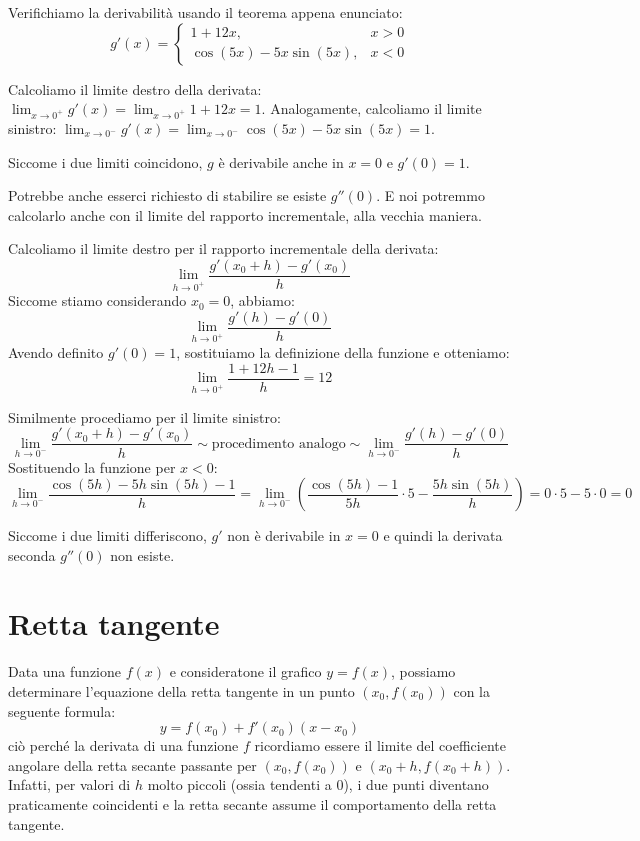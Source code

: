 \documentclass[12pt]{report}
\begin{document}
	Verifichiamo la derivabilità usando il teorema appena enunciato:
	\[
	g'(x) = 
	\begin{cases}
		1 + 12x, & x > 0 \\
		\cos(5x) - 5x\sin(5x), & x < 0
	\end{cases}
	\]
	
	Calcoliamo il limite destro della derivata: $\lim_{x \to 0^+} g'(x) = \lim_{x \to 0^+} 1 + 12x = 1$.
	Analogamente, calcoliamo il limite sinistro: $\lim_{x \to 0^-} g'(x) = \lim_{x \to 0^-} \cos(5x) - 5x\sin(5x) = 1$.
	
	Siccome i due limiti coincidono, $g$ è derivabile anche in $x = 0$ e $g'(0) = 1$.
	
	Potrebbe anche esserci richiesto di stabilire se esiste $g''(0)$. E noi potremmo calcolarlo anche con il limite del rapporto incrementale, alla vecchia maniera.
	
	Calcoliamo il limite destro per il rapporto incrementale della derivata:
	\[
	\lim_{h \to 0^+} \frac{g'(x_0 + h) - g'(x_0)}{h}
	\]
	Siccome stiamo considerando $x_0 = 0$, abbiamo:
	\[
	\lim_{h \to 0^+} \frac{g'(h) - g'(0)}{h}
	\]
	Avendo definito $g'(0) = 1$, sostituiamo la definizione della funzione e otteniamo:
	\[
	\lim_{h \to 0^+} \frac{1 + 12h - 1}{h} = 12
	\]
	
	Similmente procediamo per il limite sinistro:
	\[
	\lim_{h \to 0^-} \frac{g'(x_0 + h) - g'(x_0)}{h} \sim \text{procedimento analogo} \sim \lim_{h \to 0^-} \frac{g'(h) - g'(0)}{h}
	\]
	Sostituendo la funzione per $x < 0$:
	\[
	\lim_{h \to 0^-} \frac{\cos(5h) - 5h\sin(5h) - 1}{h} = \lim_{h \to 0^-} \left( \frac{\cos(5h) - 1}{5h} \cdot 5 - \frac{5h\sin(5h)}{h} \right) = 0 \cdot 5 - 5 \cdot 0 = 0
	\]
	
	Siccome i due limiti differiscono, $g'$ non è derivabile in $x = 0$ e quindi la derivata seconda $g''(0)$ non esiste.
	
	\section{Retta tangente}
	
	Data una funzione $f(x)$ e consideratone il grafico $y = f(x)$, possiamo determinare l'equazione della retta tangente in un punto $(x_0, f(x_0))$ con la seguente formula:
	\[
	y = f(x_0) + f'(x_0)(x - x_0)
	\]
	ciò perché la derivata di una funzione $f$ ricordiamo essere il limite del coefficiente angolare della retta secante passante per $(x_0, f(x_0))$ e $(x_0+h, f(x_0+h))$.\\
	Infatti, per valori di $h$ molto piccoli (ossia tendenti a $0$), i due punti diventano praticamente coincidenti e la retta secante assume il comportamento della retta tangente.
	
\end{document}
